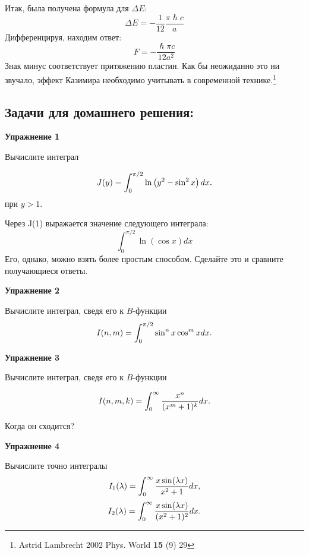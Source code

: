 \documentclass[a4paper,12pt]{article}
\begin{document}
\noindent
Итак, была получена формула для $\Delta E$:
$$
\Delta E=-\frac{1}{12}\frac{\pi\hslash c}{a}
$$
Дифференцируя, находим ответ:
$$
F=-\frac{\hslash\pi c}{12 a^2}
$$
Знак минус соответствует притяжению пластин. Как бы неожиданно это ни звучало, эффект Казимира необходимо учитывать в современной технике.\footnote{Astrid Lambrecht 2002 Phys. World \textbf{15} (9) 29}
\subsection*{Задачи для домашнего решения:}

\noindent \textbf{Упражнение 1}

\noindent Вычислите интеграл 

\begin{equation}
J(y)=\int_{0}^{\pi/2}\ln\left(y^2-\sin^2x\right)dx.\notag
\end{equation}
при $y>1$. 

\noindent
Через J(1) выражается значение следующего интеграла:
$$
\int_{0}^{\pi/2}\ln\left(\cos x\right) dx
$$
Его, однако, можно взять более простым способом. Сделайте это и сравните получающиеся ответы.

\vspace{15pt}
\noindent \textbf{Упражнение 2}

\noindent Вычислите интеграл, сведя его к $B$-функции
\begin{equation}
I(n,m)=\int_{0}^{\pi/2}\sin^{n}x\cos^{m}xdx.\notag
\end{equation}

\vspace{15pt}
\noindent \textbf{Упражнение 3}

\noindent Вычислите интеграл, сведя его к $B$-функции

\begin{equation}
I(n,m,k)	=\int_{0}^{\infty}\frac{x^{n}}{(x^{m}+1)^{k}}dx.\notag
\end{equation}

\noindent Когда он сходится?

\vspace{15pt}
\noindent \textbf{Упражнение 4}

\noindent Вычислите точно интегралы
\begin{equation}
I_{1}(\lambda)	=\int_{0}^{\infty}\frac{x\sin(\lambda x)}{x^{2}+1}dx,\notag
\end{equation}
\vspace{15pt}
\begin{equation}
I_{2}(\lambda)	=\int_{0}^{\infty}\frac{x\sin(\lambda x)}{(x^{2}+1)^{2}}dx.\notag
\end{equation}
\end{document}
